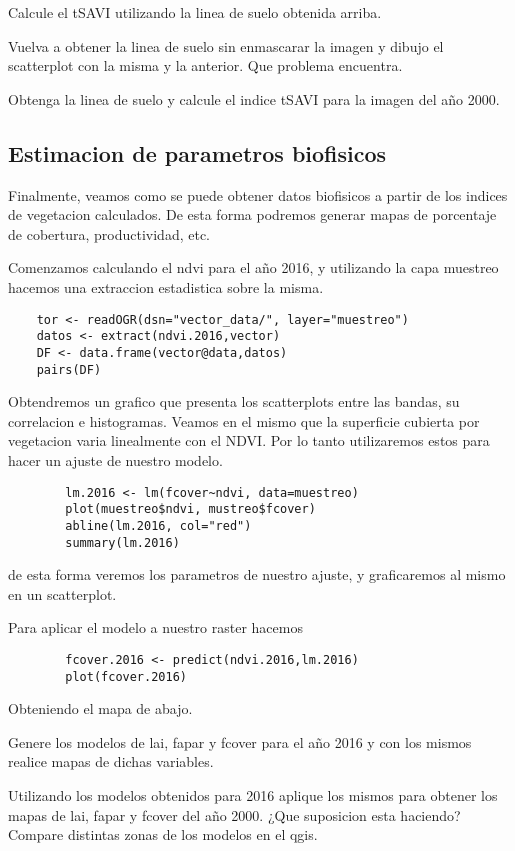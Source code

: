 \begin{act}
    Calcule el tSAVI utilizando la linea de suelo obtenida arriba.
\end{act}

\begin{act}
    Vuelva a obtener la linea de suelo sin enmascarar la imagen y dibujo el
    scatterplot con la misma y la anterior. Que problema encuentra.
\end{act}

\begin{act}
    Obtenga la linea de suelo y calcule el indice tSAVI para la imagen del año
    2000.
\end{act}

\subsection{Estimacion de parametros biofisicos}

Finalmente, veamos como se puede obtener datos biofisicos a partir de los
indices de vegetacion calculados. De esta forma podremos generar mapas de
porcentaje de cobertura, productividad, etc.

\begin{exa}
    Comenzamos calculando el ndvi para el año 2016, y utilizando la capa
    muestreo hacemos una extraccion estadistica sobre la misma.
    \begin{lstlisting}
    tor <- readOGR(dsn="vector_data/", layer="muestreo")
    datos <- extract(ndvi.2016,vector)
    DF <- data.frame(vector@data,datos)
    pairs(DF)
    \end{lstlisting}

    Obtendremos un grafico que presenta los scatterplots entre las bandas, su
    correlacion e histogramas.
    Veamos en el mismo que la superficie cubierta por vegetacion varia
    linealmente con el NDVI\@. Por lo tanto utilizaremos estos para hacer un
    ajuste de nuestro modelo.
    \begin{lstlisting}
        lm.2016 <- lm(fcover~ndvi, data=muestreo)
        plot(muestreo$ndvi, mustreo$fcover)
        abline(lm.2016, col="red")
        summary(lm.2016)
    \end{lstlisting}
    de esta forma veremos los parametros de nuestro ajuste, y graficaremos al
    mismo en un scatterplot.

    Para aplicar el modelo a nuestro raster hacemos
    \begin{lstlisting}
        fcover.2016 <- predict(ndvi.2016,lm.2016)
        plot(fcover.2016)
    \end{lstlisting}
    Obteniendo el mapa de abajo.
\end{exa}

\begin{act}
    Genere los modelos de lai, fapar y fcover para el año 2016 y con los mismos
    realice mapas de dichas variables.
\end{act}

\begin{act}
    Utilizando los modelos obtenidos para 2016 aplique los mismos para obtener
    los mapas de lai, fapar y fcover del año 2000. ¿Que suposicion esta
    haciendo? Compare distintas zonas de los modelos en el qgis.
\end{act}
